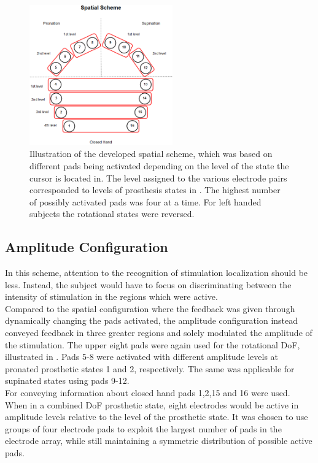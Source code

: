 \begin{figure}[H]                 
	\includegraphics[width=0.55\textwidth]{figures/El_array_spatial}  
	\caption{Illustration of the developed spatial scheme, which was based on different pads being activated depending on the level of the state the cursor is located in. The level assigned to the various electrode pairs corresponded to levels of prosthesis states in . The highest number of possibly activated pads was four at a time. For left handed subjects the rotational states were reversed.}
	\label{fig:spatial} 
\end{figure}


\subsection{Amplitude Configuration}

In this scheme, attention to the recognition of stimulation localization should be less. Instead, the subject would have to focus on discriminating between the intensity of stimulation in the regions which were active. \\
Compared to the spatial configuration where the feedback was given through dynamically changing the pads activated, the amplitude configuration instead conveyed feedback in three greater regions and solely modulated the amplitude of the stimulation. The upper eight pads were again used for the rotational DoF, illustrated in . Pads 5-8 were activated with different amplitude levels at pronated prosthetic states 1 and 2, respectively. The same was applicable for supinated states using pads 9-12. \\
For conveying information about closed hand pads 1,2,15 and 16 were used. When in a combined DoF prosthetic state, eight electrodes would be active in amplitude levels relative to the level of the prosthetic state. It was chosen to use groups of four electrode pads to exploit the largest number of pads in the electrode array, while still maintaining a symmetric distribution of possible active pads.

